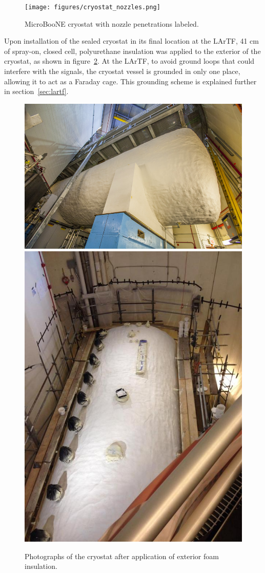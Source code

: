 \begin{figure}[htb]
\centering	
\texttt{[image: figures/cryostat\_nozzles.png]}
\caption{MicroBooNE cryostat with nozzle penetrations labeled.}
\label{fig:cryostat-drawing}
\end{figure}

Upon installation of the sealed cryostat in its final location at the LArTF, 41 cm of spray-on, closed cell, polyurethane insulation was applied to the exterior of the cryostat, as shown in figure~\ref{fig:cryostat-foam}.  At the LArTF, to avoid ground loops that could interfere with the \lartpc signals, the cryostat vessel is grounded in only one place, allowing it to act as a Faraday cage.  This grounding scheme is explained further in section~\ref{sec:lartf}.

\begin{figure}[htb]
\centering	
\includegraphics[width=0.68\linewidth]{figures/14-0222-03D.jpg}\\
\includegraphics[width=0.68\linewidth]{figures/foam2.jpg}
\caption{Photographs of the cryostat after application of exterior foam insulation.}
\label{fig:cryostat-foam}
\end{figure}


